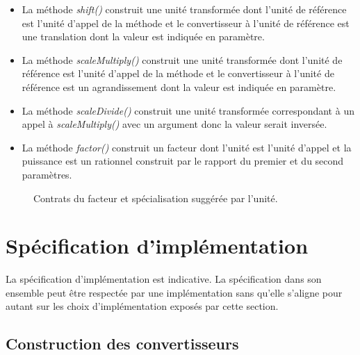 \documentclass[a4paper,draft,twoside,10pt]{article}
\begin{document}
\begin{itemize}
\item La méthode \emph{shift()} construit une unité transformée dont l'unité de référence est l'unité d'appel de la
méthode et le convertisseur à l'unité de référence est une translation dont la valeur est indiquée en paramètre.
\item La méthode \emph{scaleMultiply()} construit une unité transformée dont l'unité de référence est l'unité d'appel de
la méthode et le convertisseur à l'unité de référence est un agrandissement dont la valeur est indiquée en paramètre.
\item La méthode \emph{scaleDivide()} construit une unité transformée correspondant à un appel à \emph{scaleMultiply()}
avec un argument donc la valeur serait inversée.
\item La méthode \emph{factor()} construit un facteur dont l'unité est l'unité d'appel et la puissance est un rationnel
construit par le rapport du premier et du second paramètres.
\end{itemize}


\begin{figure}[!h]
\caption{Contrats du facteur et spécialisation suggérée par l'unité.}
\end{figure}

\section{Spécification d'implémentation}

La spécification d'implémentation est indicative. La spécification dans son ensemble peut être respectée par une
implémentation sans qu'elle s'aligne pour autant sur les choix d'implémentation exposés par cette section.

\subsection{Construction des convertisseurs}
\end{document}
